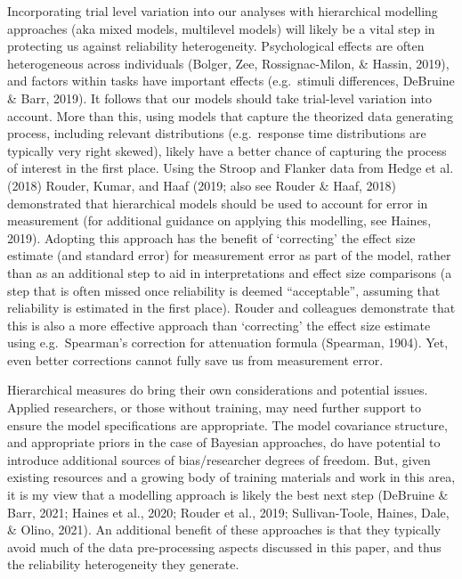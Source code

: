 \documentclass[
  man,floatsintext]{apa6}
\begin{document}
Incorporating trial level variation into our analyses with hierarchical modelling approaches (aka mixed models, multilevel models) will likely be a vital step in protecting us against reliability heterogeneity. Psychological effects are often heterogeneous across individuals (Bolger, Zee, Rossignac-Milon, \& Hassin, 2019), and factors within tasks have important effects (e.g.~stimuli differences, DeBruine \& Barr, 2019). It follows that our models should take trial-level variation into account. More than this, using models that capture the theorized data generating process, including relevant distributions (e.g.~response time distributions are typically very right skewed), likely have a better chance of capturing the process of interest in the first place. Using the Stroop and Flanker data from Hedge et al. (2018) Rouder, Kumar, and Haaf (2019; also see Rouder \& Haaf, 2018) demonstrated that hierarchical models should be used to account for error in measurement (for additional guidance on applying this modelling, see Haines, 2019). Adopting this approach has the benefit of `correcting' the effect size estimate (and standard error) for measurement error as part of the model, rather than as an additional step to aid in interpretations and effect size comparisons (a step that is often missed once reliability is deemed ``acceptable'', assuming that reliability is estimated in the first place). Rouder and colleagues demonstrate that this is also a more effective approach than `correcting' the effect size estimate using e.g.~Spearman's correction for attenuation formula (Spearman, 1904). Yet, even better corrections cannot fully save us from measurement error.

Hierarchical measures do bring their own considerations and potential issues. Applied researchers, or those without training, may need further support to ensure the model specifications are appropriate. The model covariance structure, and appropriate priors in the case of Bayesian approaches, do have potential to introduce additional sources of bias/researcher degrees of freedom. But, given existing resources and a growing body of training materials and work in this area, it is my view that a modelling approach is likely the best next step (DeBruine \& Barr, 2021; Haines et al., 2020; Rouder et al., 2019; Sullivan-Toole, Haines, Dale, \& Olino, 2021). An additional benefit of these approaches is that they typically avoid much of the data pre-processing aspects discussed in this paper, and thus the reliability heterogeneity they generate.
\end{document}
